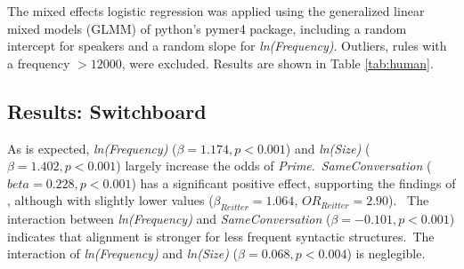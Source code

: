 \documentclass[11pt]{article}
\begin{document}
The mixed effects logistic regression was applied using the generalized linear mixed models (GLMM) of python's pymer4 package, including a random intercept for speakers and a random slope for \textit{ln(Frequency)}. Outliers, rules with a frequency $> 12000$, were excluded. Results are shown in Table \ref{tab:human}.

\begin{table}
  \centering
  \caption{\label{tab:human}
  The regression model for the Switchboard Corpus. Fixed effects, except \textit{SameConversation}, are centered. The model with the lowest $AIC$ was taken ($\Delta AIC>6$ compared to the second-best model).}
    
\end{table}

\subsection{Results: Switchboard}
As is expected, \textit{ln(Frequency)} ($\beta=1.174, p<0.001$) and \textit{ln(Size)} ($\beta=1.402, p<0.001$) largely increase the odds of \textit{Prime}.\
\textit{SameConversation} ($beta=0.228, p<0.001$) has a significant positive effect, supporting the findings of \citealp{reitter2008context}, although with slightly lower values ($\beta_{Reitter}=1.064$, $OR_{Reitter} = 2.90$). \
The interaction between \textit{ln(Frequency)} and \textit{SameConversation} ($\beta=-0.101, p<0.001$) indicates that alignment is stronger for less frequent syntactic structures.\
The interaction of \textit{ln(Frequency)} and \textit{ln(Size)} ($\beta=0.068, p<0.004$) is neglegible.
\end{document}
